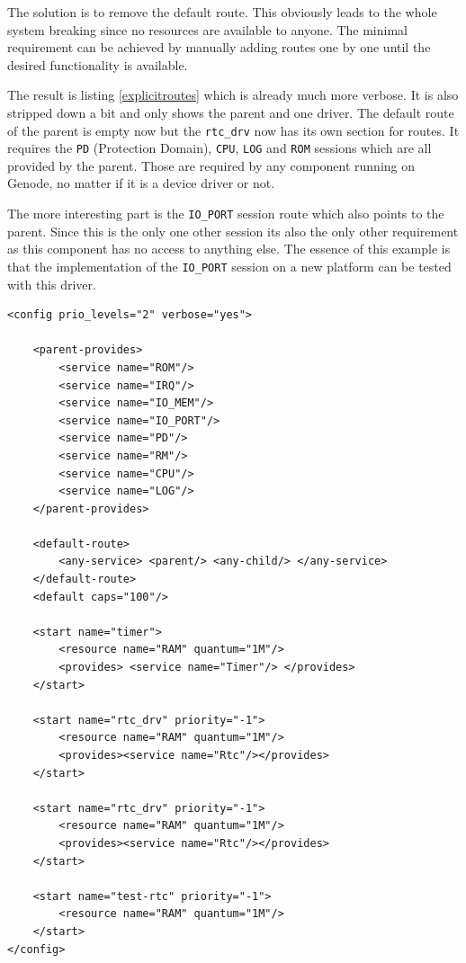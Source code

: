 \documentclass[
a4paper,
11pt,
twoside
]{report}
\begin{document}
		The solution is to remove the default route.
		This obviously leads to the whole system breaking since no resources are available to anyone.
		The minimal requirement can be achieved by manually adding routes one by one until the desired functionality is available.
		
		The result is listing \ref{explicitroutes} which is already much more verbose.
		It is also stripped down a bit and only shows the parent and one driver.
		The default route of the parent is empty now but the \texttt{rtc\_drv} now has its own section for routes.
		It requires the \texttt{PD} (Protection Domain), \texttt{CPU}, \texttt{LOG} and \texttt{ROM} sessions which are all provided by the parent.
		Those are required by any component running on Genode, no matter if it is a device driver or not.
		
		The more interesting part is the \texttt{IO\_PORT} session route which also points to the parent.
		Since this is the only one other session its also the only other requirement as this component has no access to anything else.
		The essence of this example is that the implementation of the \texttt{IO\_PORT} session on a new platform can be tested with this driver.
		
		\begin{lstlisting}[basicstyle=\ttfamily\footnotesize]
<config prio_levels="2" verbose="yes">
		
	<parent-provides>
		<service name="ROM"/>
		<service name="IRQ"/>
		<service name="IO_MEM"/>
		<service name="IO_PORT"/>
		<service name="PD"/>
		<service name="RM"/>
		<service name="CPU"/>
		<service name="LOG"/>
	</parent-provides>
		
	<default-route>
		<any-service> <parent/> <any-child/> </any-service>
	</default-route>
	<default caps="100"/>
		
	<start name="timer">
		<resource name="RAM" quantum="1M"/>
		<provides> <service name="Timer"/> </provides>
	</start>
		
	<start name="rtc_drv" priority="-1">
		<resource name="RAM" quantum="1M"/>
		<provides><service name="Rtc"/></provides>
	</start>
		
	<start name="rtc_drv" priority="-1">
		<resource name="RAM" quantum="1M"/>
		<provides><service name="Rtc"/></provides>
	</start>
		
	<start name="test-rtc" priority="-1">
		<resource name="RAM" quantum="1M"/>
	</start>
</config>
		\end{lstlisting}
		
\end{document}
